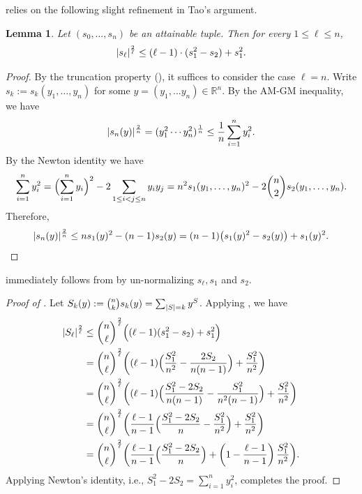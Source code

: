 \documentclass[10pt,a4paper]{article}
\newtheorem{lemma}[theorem]{Lemma}
\theoremstyle{definition}
\newcommand{\R}{\mathbb R}
\DeclarePairedDelimiter\abs{\lvert}{\rvert}
\begin{document}
 relies on the following slight refinement in Tao's argument.

\begin{lemma} \label{lemma:tao}
  Let $(s_0, \ldots, s_n)$ be an attainable tuple.
  Then for every $1 \le \ell \le n$,
  \[
    \abs{s_\ell}^{\frac{2}{\ell}}
    \le (\ell-1) \cdot (s_1^2 - s_2) + s_1^2 .
  \]
\end{lemma}

\begin{proof}
  By the truncation property (), it suffices to consider the case $\ell=n$.
  Write $s_k := s_k(y_1, \ldots, y_n)$ for some $y = (y_1, \ldots y_n) \in \R^n$.
  By the AM-GM inequality, we have
  \[
    \abs{s_n(y)}^{\frac{2}{n}}
    = (y_1^2 \cdots y_n^2)^{\frac{1}{n}}
    \le \frac{1}{n} \sum_{i=1}^n y_i^2 .
  \]
  By the Newton identity we have
  \begin{align*}
    \sum_{i=1}^n y_i^2
    = \Bigl(\sum_{i=1}^n y_i \Bigr)^2 - 2 \sum_{1 \le i<j \le n} y_i y_j
    = n^2 s_1(y_1, \ldots, y_n)^2 - 2 \binom{n}{2} s_2(y_1, \ldots, y_n) .
  \end{align*}
  Therefore,
  \[
    \abs{s_n(y)}^{\frac{2}{n}}
    \le n s_1(y)^2 - (n-1)s_2(y)
    = (n-1) \bigl( s_1(y)^2 - s_2(y) \bigr) + s_1(y)^2 . \qedhere
  \]
\end{proof}

 immediately follows from  by un-normalizing $s_\ell, s_1$ and $s_2$.

\begin{proof}[Proof of ] 
  Let $S_k(y) := \binom{n}{k} s_k(y) = \sum_{\abs{S}=k} y^S$.
  Applying , we have
  \begin{align*}
      \abs{S_\ell}^{\frac{2}{\ell}}
      &\le \binom{n}{\ell}^{\frac{2}{\ell}} \Bigl( (\ell-1) (s_1^2 - s_2) + s_1^2 \Bigr) \\
      &= \binom{n}{\ell}^{\frac{2}{\ell}} \biggl( (\ell-1) \Bigl( \frac{S_1^2}{n^2} - \frac{2S_2}{n(n-1)} \Bigr) + \frac{S_1^2}{n^2} \biggr) \\
      &= \binom{n}{\ell}^{\frac{2}{\ell}} \biggl( (\ell-1) \Bigl( \frac{S_1^2 - 2S_2}{n(n-1)} - \frac{S_1^2}{n^2(n-1)} \Bigr) + \frac{S_1^2}{n^2} \biggr) \\
      &= \binom{n}{\ell}^{\frac{2}{\ell}} \biggl( \frac{\ell-1}{n-1} \Bigl( \frac{S_1^2 - 2S_2}{n} - \frac{S_1^2}{n^2} \Bigr) + \frac{S_1^2}{n^2} \biggr) \\
      &= \binom{n}{\ell}^{\frac{2}{\ell}} \biggl( \frac{\ell-1}{n-1} \Bigl( \frac{S_1^2 - 2S_2}{n} \Bigr) + \left(1 - \frac{\ell-1}{n-1} \right) \frac{S_1^2}{n^2} \biggr) .
  \end{align*}
  Applying Newton's identity, i.e., $S_1^2 - 2S_2 = \sum_{i=1}^n y_i^2$, completes the proof.
\end{proof}
\end{document}
